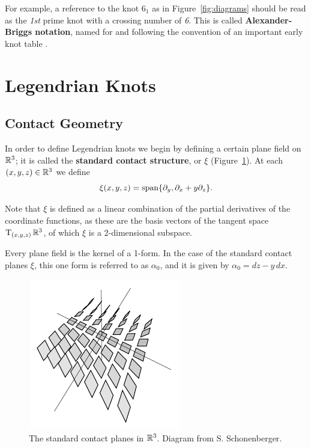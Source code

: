 For example, a reference to the knot $6_1$ as in Figure~\ref{fig:diagrams} should be read as the \emph{1st} prime knot with a crossing number of \emph{6}. This is called \textbf{Alexander-Briggs notation}, named for and following the convention of an important early knot table \cite{alexander-briggs}.

\section{Legendrian Knots}
\subsection{Contact Geometry}

In order to define Legendrian knots we begin by defining a certain plane field on $\mathbb{R}^3$; it is called the \textbf{standard contact structure}, or $\xi$ (Figure~\ref{fig:contact-planes}). At each $(x, y, z) \in \mathbb{R}^3$ we define
\[
    \xi(x, y, z) = \operatorname{span} \{\partial_y, \partial_x + y\partial_z\}.
\]

Note that $\xi$ is defined as a linear combination of the partial derivatives of the coordinate functions, as these are the basis vectors of the tangent space $\operatorname{T}_{(x, y, z)} \mathbb{R}^3$, of which $\xi$ is a 2-dimensional subspace.

Every plane field is the kernel of a 1-form. In the case of the standard contact planes $\xi$, this one form is referred to as $\alpha_0$, and it is given by ${\alpha_0 = dz - y \, dx}$.

\begin{figure}[ht]
    \centering
    \includegraphics[width=0.6\textwidth, height=2.6in]{images/contact-planes.pdf}
    \caption{The standard contact planes in $\mathbb{R}^3$. Diagram from S. Schonenberger.}%
    \label{fig:contact-planes}
\end{figure}

